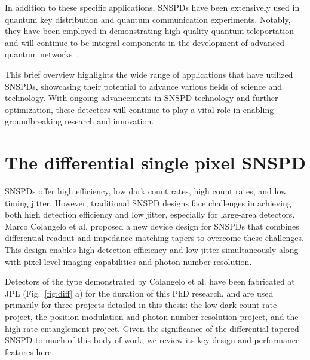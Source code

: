 \documentclass[11pt]{caltech_thesis} %
\begin{document}
In addition to these specific applications, SNSPDs have been extensively used in quantum key distribution and quantum communication experiments. Notably, they have been employed in demonstrating high-quality quantum teleportation~\autocite{Valivarthi2020} and will continue to be integral components in the development of advanced quantum networks~\autocite{Valivarthi2022}.

This brief overview highlights the wide range of applications that have utilized SNSPDs, showcasing their potential to advance various fields of science and technology. With ongoing advancements in SNSPD technology and further optimization, these detectors will continue to play a vital role in enabling groundbreaking research and innovation.

\hypertarget{the-differential-single-pixel-snspd}{%
\section{The differential single pixel SNSPD}\label{the-differential-single-pixel-snspd}}

SNSPDs offer high efficiency, low dark count rates, high count rates, and low timing jitter. However, traditional SNSPD designs face challenges in achieving both high detection efficiency and low jitter, especially for large-area detectors. Marco Colangelo et al. \autocite{Colangelo2023} proposed a new device design for SNSPDs that combines differential readout and impedance matching tapers to overcome these challenges. This design enables high detection efficiency and low jitter simultaneously along with pixel-level imaging capabilities and photon-number resolution.

Detectors of the type demonstrated by Colangelo et al. \autocite{Colangelo2023} have been fabricated at JPL (Fig.~\ref{fig:diff} a) for the duration of this PhD research, and are used primarily for three projects detailed in this thesis: the low dark count rate project, the position modulation and photon number resolution project, and the high rate entanglement project. Given the significance of the differential tapered SNSPD to much of this body of work, we review its key design and performance features here.
\end{document}
